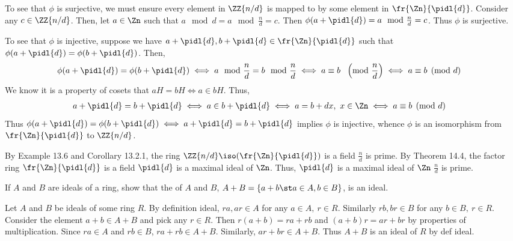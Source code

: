 \documentclass{article}
\begin{document}
\begin{solution}
\begin{enumerate}[label=\bd{\alph*.}]
\begin{subproof}[Claim 1]
\begin{subproof}[Claim 2]
        To see that \( \phi \) is surjective, we must ensure every element in \( \ZZ{n/d} \) is mapped to by some element in \( \fr{\Zn}{\pidl{d}} \).
        Consider any \( c\in\ZZ{n/d} \).
        Then, let \( a\in\Zn \) such that \( a\mod d = a\mod{\frac{n}{d}} = c \).
        Then \( \phi(a+\pidl{d}) = a\mod{\frac{n}{d}} = c \).
        Thus \( \phi \) is surjective.

        To see that \( \phi \) is injective, suppose we have \( a+\pidl{d}, b+\pidl{d}\in\fr{\Zn}{\pidl{d}} \) such that \( \phi(a+\pidl{d}) = \phi(b+\pidl{d}) \).
        Then, \begin{align*}
          \phi(a+\pidl{d}) = \phi(b+\pidl{d}) &\iff a\mod{\frac{n}{d}} = b\mod{\frac{n}{d}} \iff a \equiv b\ \,\, \left(\text{mod }\frac{n}{d}\right) \iff a \equiv b\pmod d
        \end{align*}
        We know it is a property of cosets that \( aH=bH \iff a\in bH \).
        Thus, \begin{align*}
          a+\pidl{d} = b+\pidl{d} &\iff a\in b+\pidl{d} \iff a = b+dx,\ x\in\Zn \iff a\equiv b\pmod d
        \end{align*}
        Thus \( \phi(a+\pidl{d}) = \phi(b+\pidl{d})\iff a+\pidl{d}=b+\pidl{d} \) implies \( \phi \) is injective, whence \( \phi \) is an isomorphism from \( \fr{\Zn}{\pidl{d}} \) to \( \ZZ{n/d} \).
      \end{subproof}
      By Example 13.6 and Corollary 13.2.1, the ring \( \ZZ{n/d}\iso (\fr{\Zn}{\pidl{d}}) \) is a field \iff \( \frac{n}{d} \) is prime.
      By Theorem 14.4, the factor ring \( \fr{\Zn}{\pidl{d}} \) is a field \iff \( \pidl{d} \) is a maximal ideal of \( \Zn \).
      Thus, \( \pidl{d} \) is a maximal ideal of \( \Zn \) \iff \( \frac{n}{d} \) is prime.
    \end{subproof}
\end{enumerate}
\end{solution}
\pagebreak

If \( A \) and \( B \) are ideals of a ring, show that the  of \( A \) and \( B \), \( A+B = \{a+b\st a\in A,b\in B\} \), is an ideal.

\begin{solution} %
  Let \( A \) and \( B \) be ideals of some ring \( R \). By definition ideal, \( ra,ar\in A \) for any \( a\in A,\ r\in R \). Similarly \( rb,br\in B \) for any \( b\in B,\ r\in R \). Consider the element \( a+b\in A+B \) and pick any \( r\in R \). Then \( r(a+b) = ra+rb \) and \( (a+b)r = ar+br \) by properties of multiplication. Since \( ra\in A \) and \( rb\in B \), \( ra+rb \in A+B \). Similarly, \( ar+br \in A+B \). Thus \( A+B \) is an ideal of \( R \) by def ideal.
\end{solution}
\end{document}
